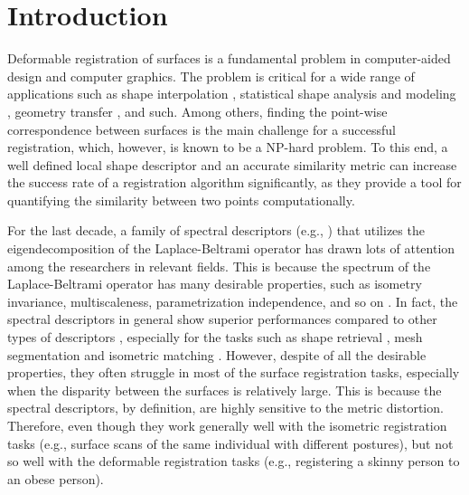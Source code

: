 \documentclass[5p,twocolumn,10pt,times]{elsarticle}
\begin{document}
\section{Introduction}
\label{sec:1}
 Deformable registration of surfaces is a fundamental problem in computer-aided design and computer graphics. The problem is critical for a wide range of applications such as shape interpolation \cite{Baek2015,Kilian:2007:GMS:1275808.1276457}, statistical shape analysis and modeling \cite{allen2003space,Baek2012}, geometry transfer \cite{sumner2004deformation}, and such. Among others, finding the point-wise correspondence between surfaces is the main challenge for a successful registration, which, however, is known to be a NP-hard problem. To this end, a well defined local shape descriptor and an accurate similarity metric can increase the success rate of a registration algorithm significantly, as they provide a tool for quantifying the similarity between two points computationally.

For the last decade, a family of spectral descriptors (e.g., \cite{Reuter2006,rustamov2007laplace,sun2009concise,aubry2011wave,bronstein2010scale}) that utilizes the eigendecomposition of the Laplace-Beltrami operator  \cite{rosenberg1997} has drawn lots of attention among the researchers in relevant fields. This is because the spectrum of the Laplace-Beltrami operator has many desirable properties, such as isometry invariance, multiscaleness, parametrization independence, and so on \cite{reuter2005laplace,sun2009concise}. In fact, the spectral descriptors in general show superior performances compared to other types of descriptors \cite{lian2013comparison}, especially for the tasks such as shape retrieval \cite{li2014spatially,bronstein2010scale}, mesh segmentation \cite{aubry2011pose,fang2011heat} and isometric matching \cite{ovsjanikov2010one}. However, despite of all the desirable properties, they often struggle in most of the surface registration tasks, especially when the disparity between the surfaces is relatively large. This is because the spectral descriptors, by definition, are highly sensitive to the metric distortion. Therefore, even though they work generally well with the isometric registration tasks (e.g., surface scans of the same individual with different postures), but not so well with the deformable registration tasks (e.g., registering a skinny person to an obese person).
\end{document}
